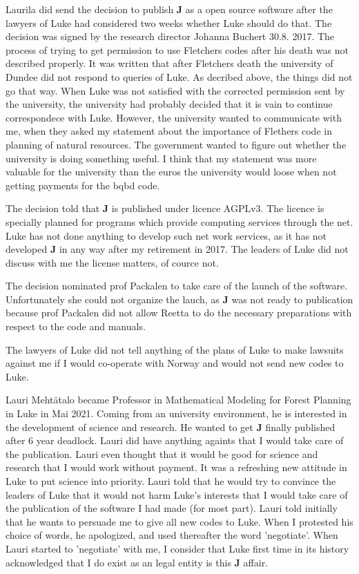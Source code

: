 Laurila did send the decision to publish \textbf{J} as a open source software
after the lawyers of Luke
had considered two weeks whether Luke should do that. The decision was
signed by the research director Johanna Buchert 30.8. 2017.
The process of trying to
get permission to use Fletchers codes after his death was not described properly.
It was written
that after Fletchers death the university of Dundee did not
respond to queries of Luke. As decribed above, the things did not go that way.
When Luke was not satisfied with the corrected  permission sent
by the university, the university had probably decided that
it is vain to continue correspondece with Luke. However,
the university wanted to communicate with me,
when they asked my statement about the importance of Flethers
code in planning of natural resources.
The government wanted to figure out whether the
university is doing something useful. I think that my statement
was more valuable for
the university than the euros the university would loose when
not getting payments for the bqbd code.

The decision told that \textbf{J} is published under licence AGPLv3.
The licence is specially
planned for programs which provide computing services through the net.
Luke has not done anything to develop such net work services, as it has not
developed \textbf{J} in any way after my retirement in 2017.
The leaders of Luke did not discuss with
me the license matters, of cource not.

The decision nominated prof Packalen to take care of the launch of the software.
Unfortunately she could not organize the lauch, as \textbf{J} was not ready to publication
because prof Packalen did not allow Reetta to do the necessary
preparations with respect to the code and manuals.

The lawyers of Luke did not tell anything of the plans of Luke to make lawsuits
against me if I would co-operate with Norway and would not send new codes to Luke.

Lauri Mehtätalo became Professor in Mathematical Modeling for Forest Planning
in Luke in Mai 2021.
Coming from an university environment, he is interested
in the development of science
and research. He wanted to get \textbf{J} finally published after 6 year deadlock.
Lauri did have anything againts that I would take care
of the publication. Lauri even thought that it
would be good for science and research that I would
work without payment. It was a refreshing new attitude in Luke
to put science into priority.
Lauri told that he would try to convince the leaders of Luke
that it would not harm Luke's interests that I would
take care of the publication of
the software I had made (for most part). Lauri told initially that
he wants to persuade
me to give all new codes to Luke. When I protested his choice of words,
he apologized, and used thereafter the word 'negotiate'. When Lauri started to 'negotiate' with
me, I consider that Luke first time in its history acknowledged that I do exist
as an legal entity is this \textbf{J} affair.

